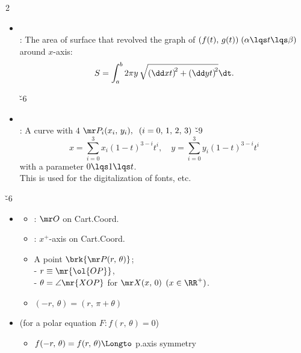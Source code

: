 \documentclass[dvipdfmx,a4paper,titlepage,9pt]{jsarticle}
\begin{document}
\begin{multicols*}{2}
\begin{itemize}
\begin{pfbox}
\begin{proof}[]
Since $\D t=(\beta-\alpha)/n\longto 0^+$ as $n\longto \infty$, \\and $t^*_{i,x},\,t^*_{i,y}\longto t_i$ as $\D t\longto 0^+$, we have\v{-7}
$$\begin{aligned}
  L&=\lim_{n\to\infty}\sum_{i=1}^n\D L_i \\
   &=\lim_{n\to\infty}\sum_{i=1}^n\D t\sqrt{\left[\dd{}tx(t^*_{i,x})\right]^2+\left[\dd {}ty(t^*_{i,y})\right]^2} \\
   &=\int_\alpha^\beta\sqrt{\left(\dd xt\right)^2+\left(\dd yt\right)^2}\dt.
  \end{aligned}$$
\end{proof}
\end{pfbox}

\item[-]  \\
: The area of surface that revolved the graph of $(f(t),\,g(t))\;(\alpha\lqs t\lqs\beta)$ around $x$-axis:
$$S=\int_a^b2\pi y\,\sqrt{\left(\dd xt\right)^{\!2}+\left(\dd yt\right)^{\!2}}\dt.$$

\; \v{-6}

\item[-]  \\
: A curve with $4$  $\mr P_i(x_i,\,y_i), \\
\;\;(i=0,\,1,\,2,\,3)$ \v{-9}
$$x=\sum_{i=0}^3x_i(1-t)^{3-i}t^i,\quad y=\sum_{i=0}^3y_i(1-t)^{3-i}t^i$$
\;\;with a parameter $0\lqs1\lqs t$. \\
\;\;This is used for the digitalization of fonts, etc.
\end{itemize}

\;

\v{-6}
\begin{itemize}
\item[-] 
\begin{itemize}[label={$\cdot$}]
\setlength{\leftskip}{-10pt}
\item {}: $\mr O$ on Cart.Coord.
\item {}: $x^+$-axis on Cart.Coord.
\item A point $\brk{\mr P(r,\,\theta)}$; \\
      \; - $r\equiv\mr{\ol{OP}}$, \\
      \; - $\theta=\angle\mr{XOP}$ for $\mr X(x,\,0)$ $(x\in\RR^+)$.
\item $(-r,\,\theta)=(r,\,\pi+\theta)$ \\
\end{itemize}
\item[-]  (for a polar equation $F\!: f(r,\,\theta)=0$)
\begin{itemize}
\setlength{\leftskip}{-10pt}
\item[$\cdot$] $f(-r,\,\theta)=f(r,\,\theta)\Longto$ p.axis symmetry \\
\end{itemize}


\end{itemize}
\end{multicols*}
\end{document}
